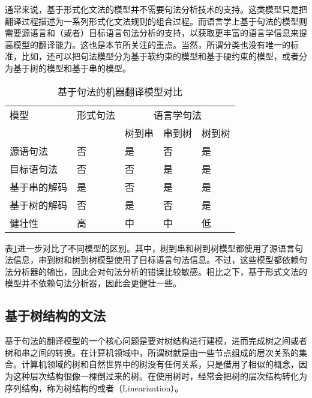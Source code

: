 \parinterval 通常来说，基于形式化文法的模型并不需要句法分析技术的支持。这类模型只是把翻译过程描述为一系列形式化文法规则的组合过程。而语言学上基于句法的模型则需要源语言和（或者）目标语言句法分析的支持，以获取更丰富的语言学信息来提高模型的翻译能力。这也是本节所关注的重点。当然，所谓分类也没有唯一的标准，比如，还可以把句法模型分为基于软约束的模型和基于硬约束的模型，或者分为基于树的模型和基于串的模型。

\begin{table}[htp]{
\begin{center}
\caption{基于句法的机器翻译模型对比}
\label{tab:8-3}
{
\begin{tabular}{l | l | l | l | l}
模型 & 形式句法 & \multicolumn{3}{c}{语言学句法} \\
\cline{3-5}
\rule{0pt}{15pt} & & \multicolumn{1}{c|}{树到串} & \multicolumn{1}{c}{串到树} & \multicolumn{1}{|c}{树到树} \\
\hline
\rule{0pt}{15pt}源语句法 & 否 & 是 & 否 & 是 \\
\rule{0pt}{15pt}目标语句法 & 否 & 否 & 是 & 是 \\
\rule{0pt}{15pt}基于串的解码 & 是 & 否 & 是 & 是 \\
\rule{0pt}{15pt}基于树的解码 & 否 & 是 & 否 & 是 \\
\rule{0pt}{15pt}健壮性 & 高 & 中 & 中 & 低 \\
\end{tabular}
}
\end{center}
}\end{table}

\parinterval 表\ref{tab:8-3}进一步对比了不同模型的区别。其中，树到串和树到树模型都使用了源语言句法信息，串到树和树到树模型使用了目标语言句法信息。不过，这些模型都依赖句法分析器的输出，因此会对句法分析的错误比较敏感。相比之下，基于形式文法的模型并不依赖句法分析器，因此会更健壮一些。


\subsection{基于树结构的文法}

\parinterval 基于句法的翻译模型的一个核心问题是要对树结构进行建模，进而完成树之间或者树和串之间的转换。在计算机领域中，所谓树就是由一些节点组成的层次关系的集合。计算机领域的树和自然世界中的树没有任何关系，只是借用了相似的概念，因为这种层次结构很像一棵倒过来的树。在使用树时，经常会把树的层次结构转化为序列结构，称为树结构的{\small{}}或者{\small{}}（Linearization）。

